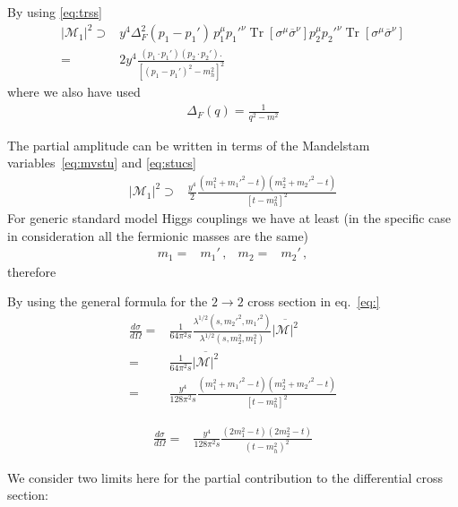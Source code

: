 By using \eqref{eq:trss}
\begin{align}
  \left| \mathcal{M}_1 \right|^2 \supset & y^4  \Delta_F^2(p_1-p_1')\,p_1^{\mu}{p_1'}^{\nu}\operatorname{Tr} \left[  \sigma^{\mu}  \overline{\sigma}^{\nu} \right] p_2^{\mu}{p_2'}^{\nu} \operatorname{Tr}\left[\sigma^{\mu} \overline{\sigma}^{\nu} \right]\nonumber\\
= & 2y^4  \frac{\left( p_1\cdot p_1' \right) \left( p_2\cdot{p_2'} \right).}{\left[ \left(p_1-p_1'\right)^2-m^2_h \right]^2}\,
\end{align}
where we also have used
\begin{align}
  \Delta_F(q)=\frac{1}{q^2-m^2}
\end{align}

The partial amplitude can be written in terms of the Mandelstam variables~\eqref{eq:mvstu} and \eqref{eq:stucs}
\begin{align}
  \left| \mathcal{M}_1 \right|^2  \supset & \frac{y^4}{2}  \frac{ \left(m_1^2+{m_1'}^2-t  \right)\left( m_2^2+{m_2'}^2-t \right)}{\left[ t-m^2_h \right]^2}
\end{align}
For generic standard model Higgs couplings we have at least (in the specific case in consideration all the fermionic masses are the same) 
\begin{align}
  m_1=&m_1'\,,&m_2=&m_2'\,,
\end{align}
therefore

By using the general formula for the $2\to 2$ cross section in eq.~\eqref{eq:}
\begin{align}
  \frac{d\sigma}{d\Omega}=&\frac{1}{64\pi^2s}
\frac{\lambda^{1/2}(s,{m_2'}^2,{m_1'}^2)}{\lambda^{1/2}(s,m_2^2,m_1^2)}
\overline{|\mathcal{M}|^2} \nonumber\\
=&\frac{1}{64\pi^2s}
\overline{|\mathcal{M}|^2} \nonumber\\
=&\frac{y^4}{128\pi^2s}
 \frac{ \left(m_1^2+{m_1'}^2-t  \right)\left( m_2^2+{m_2'}^2-t \right)}{\left[ t-m^2_h \right]^2}
\end{align}

\begin{align}
    \frac{d\sigma}{d\Omega}
=&\frac{y^4}{128\pi^2s}
  \frac{ \left(2m_1^2-t  \right)\left( 2m_2^2-t \right)}{\left(t-m^2_h\right)^2}
\end{align}

We consider two limits here for the partial contribution to the differential cross section:

